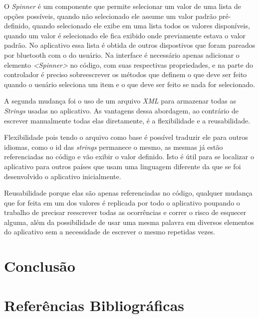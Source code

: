 \documentclass[hidelinks,12pt]{article}
\begin{document}
O \textit{Spinner} \'e um componente que permite selecionar um valor de uma lista de op\c{c}\~oes poss\'iveis, quando n\~ao selecionado ele assume um valor padr\~ao pr\'e-definido, quando selecionado ele exibe em uma lista todos os valores dispon\'iveis, quando um valor \'e selecionado ele fica exibido onde previamente estava o valor padr\~ao. No aplicativo essa lista \'e obtida de outros dispostivos que foram pareados por bluetooth com o do usu\'ario.
Na interface \'e necess\'ario apenas adicionar o elemento \textit{\textless{Spinner}\textgreater} no c\'odigo, com suas respectivas propriedades, e na parte do controlador \'e preciso sobreescrever os m\'etodos que definem o que deve ser feito quando o usu\'ario seleciona um item e o que deve ser feito se nada for selecionado.

A segunda mudan\c{c}a foi o uso de um arquivo \textit{XML} para armazenar todas as \textit{Strings} usadas no aplicativo. As vantagens dessa abordagem, ao contr\'ario de escrever manualmente todas elas diretamente, \'e a flexibilidade e a reusabilidade.

Flexibilidade pois tendo o arquivo como base \'e poss\'ivel traduzir ele para outros idiomas, como o id das \textit{strings} permanece o mesmo, as mesmas j\'a est\~ao referenciadas no c\'odigo e v\~ao exibir o valor definido. Isto \'e útil para se localizar o aplicativo para outros pa\'ises que usam uma linguagem diferente da que se foi desenvolvido o aplicativo inicialmente.

Reusabilidade porque elas s\~ao apenas referenciadas no c\'odigo, qualquer mudan\c{c}a que for feita em um dos valores \'e replicada por todo o aplicativo poupando o trabalho de precisar reescrever todas as ocorrências e correr o risco de esquecer alguma, al\'em da possibilidade de usar uma mesma palavra em diversos elementos do aplicativo sem a necessidade de escrever o mesmo repetidas vezes.
\section{Conclus\~ao}
\newpage
\section*{Refer\^encias Bibliogr\'aficas}
\renewcommand\refname{}


\end{document}
